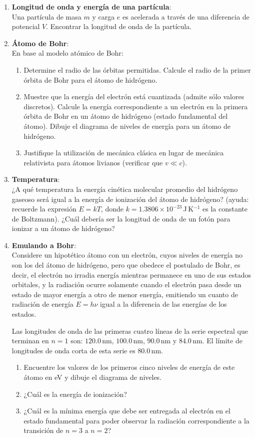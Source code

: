 \documentclass[a4paper,12pt]{article}
\begin{document}
\begin{enumerate}
\item {\bf{Longitud de onda y energía de una partícula}}:\\
	Una partícula de masa $m$ y carga $e$ es acelerada a través de una
		diferencia de potencial $V$.  Encontrar la longitud de onda de la
		partícula. 

\item {\bf{Átomo de Bohr}}:\\
	En base al modelo atómico de Bohr:
	\begin{enumerate}
		\item Determine el radio de las órbitas permitidas. Calcule el radio de
			la primer órbita de Bohr para el átomo de hidrógeno.
		\item Muestre que la energía del electrón está cuantizada (admite sólo
			valores discretos). Calcule la energía correspondiente a un
			electrón en la primera órbita de Bohr en un átomo de hidrógeno
			(estado fundamental del átomo). Dibuje el diagrama de niveles de
			energía para un átomo de hidrógeno.
		\item Justifique la utilización de mecánica clásica en lugar de
			mecánica relativista para átomos livianos (verificar que $v \ll
			c$).
	\end{enumerate}

\item {\bf{Temperatura}}:\\
	¿A qué temperatura la energía cinética molecular promedio del hidrógeno
		gaseoso será igual a la energía de ionización del átomo de hidrógeno?
		(ayuda: recuerde la expresión $E=k T$, donde $k=1.3806 \times
		10^{-23}$\,J\,K$^{-1}$ es la constante de Boltzmann). ¿Cuál debería ser
		la longitud de onda de un fotón para ionizar a un átomo de hidrógeno?
	
\item {\bf{Emulando a Bohr}}:\\
	Considere un hipotético átomo con un electrón, cuyos niveles de energía no
		son los del átomo de hidrógeno, pero que obedece el postulado de Bohr,
		es decir, el electrón no irradia energía mientras permanece en uno de
		sus estados orbitales, y la radiación ocurre solamente cuando el
		electrón pasa desde un estado de mayor energía a otro de menor energía,
		emitiendo un cuanto de radiación de energía $E=h\nu$ igual a la
		diferencia de las energías de los estados. 
		
	Las longitudes de onda de las primeras cuatro líneas de la serie
		espectral que terminan en $n = 1$ son: $120.0$\,nm, $100.0$\,nm,
		$90.0$\,nm y $84.0$\,nm. El límite de longitudes de onda corta de esta
		serie es $80.0$\,nm. 
	\begin{enumerate}
		\item Encuentre los valores de los primeros cinco niveles de energía de
			este átomo en eV y dibuje el diagrama de niveles.
		\item ¿Cuál es la energía de ionización?
		\item ¿Cuál es la mínima energía que debe ser entregada al electrón en
			el estado fundamental para poder observar la radiación
			correspondiente a la transición de $n = 3$ a $n = 2$?
	\end{enumerate}


\end{enumerate}
\end{document}
